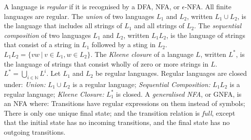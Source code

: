  A language is \emph{regular} if it is recognised by a DFA, NFA, or $\epsilon$-NFA.
 All finite languages are regular.
 The \textit{union} of two languages $L_1$ and $L_2$, written $L_1 \cup L_2$, is the language that includes all strings of $L_1$ and all strings of $L_2$.
 The \textit{sequential composition} of two languages $L_1$ and $L_2$, written $L_1L_2$, is the language of strings that consist of a string in $L_1$ followed by a sting in $L_2$. $L_1L_2 = \{vw\ |\ v\in L_1, w\in L_2\}$.
 The \textit{Kleene closure} of a language $L$, written $L^*$, is the language of strings that consist wholly of zero or more strings in $L$. $L^* = \bigcup_{i \in \mathbb{N}} L^i$.
 Let $L_1$ and $L_2$ be regular languages. Regular languages are closed under:
\emph{Union:} $L_1 \cup L_2$ is a regular language;
\emph{Sequential Composition:} $L_1L_2$ is a regular language;
\emph{Kleene Closure:} $L_1^*$ is closed.
 A \textit{generalised NFA}, or GNFA, is an NFA where: Transitions have regular expressions on them instead of symbols; There is only one unique final state; and the transition relation is \textit{full}, except that the initial state has no incoming transitions, and the final state has no outgoing transitions.